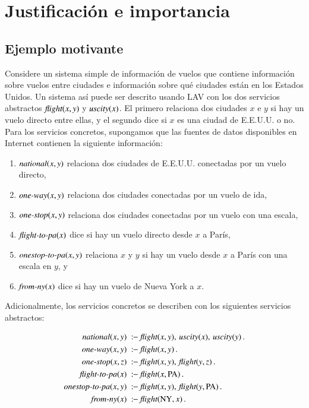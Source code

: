 \section{Justificación e importancia}

\subsection{Ejemplo motivante}

\newcommand{\flight}{\text{\it flight}}
\newcommand{\UScity}{\text{\it uscity}}
\newcommand{\national}{\text{\it national}}
\newcommand{\oneway}{\text{\it one-way}}
\newcommand{\onestop}{\text{\it one-stop}}
\newcommand{\flightPA}{\text{\it flight-to-pa}}
\newcommand{\onestopPA}{\text{\it onestop-to-pa}}
\newcommand{\fromNY}{\text{\it from-ny}}
\newcommand{\PA}{\text{PA}}
\newcommand{\NY}{\text{NY}}
\newcommand{\AL}{\text{AL}}

Considere un sistema simple de información de vuelos que contiene información
sobre vuelos entre ciudades e información sobre qué ciudades están en los
Estados Unidos. Un sistema así puede ser descrito usando LAV con los dos servicios
abstractos $\flight(x,y)$ y $\UScity(x)$. El primero relaciona dos ciudades $x$ e $y$ si
hay un vuelo directo entre ellas, y el segundo dice si $x$ es una ciudad de
E.E.U.U.  o no. Para los servicios concretos, supongamos que las fuentes de
datos disponibles en Internet contienen la siguiente información:

\begin{enumerate}[--]
\item $\national(x,y)$ relaciona dos ciudades de E.E.U.U. conectadas por un vuelo directo,
\item $\oneway(x,y)$ relaciona dos ciudades conectadas por un vuelo de ida,
\item $\onestop(x,y)$ relaciona dos ciudades conectadas por un vuelo con una escala,
\item $\flightPA(x)$ dice si hay un vuelo directo desde $x$ a París,
\item $\onestopPA(x,y)$ relaciona $x$ y $y$ si hay un vuelo desde $x$ a París con una escala en $y$, y
\item $\fromNY(x)$ dice si hay un vuelo de Nueva York a $x$.
\end{enumerate}

Adicionalmente, los servicios concretos se describen con los siguientes
servicios abstractos:

\begin{alignat*}{1}
\national(x,y)\   &\qrule\ \flight(x,y),\,\UScity(x),\,\UScity(y)\,. \\
\oneway(x,y)\     &\qrule\ \flight(x,y)\,. \\
\onestop(x,z)\    &\qrule\ \flight(x,y),\,\flight(y,z)\,. \\
\flightPA(x)\     &\qrule\ \flight(x,\PA)\,. \\
\onestopPA(x,y)\  &\qrule\ \flight(x,y),\,\flight(y,\PA)\,. \\
\fromNY(x)\       &\qrule\ \flight(\NY,x)\,.
\end{alignat*}

